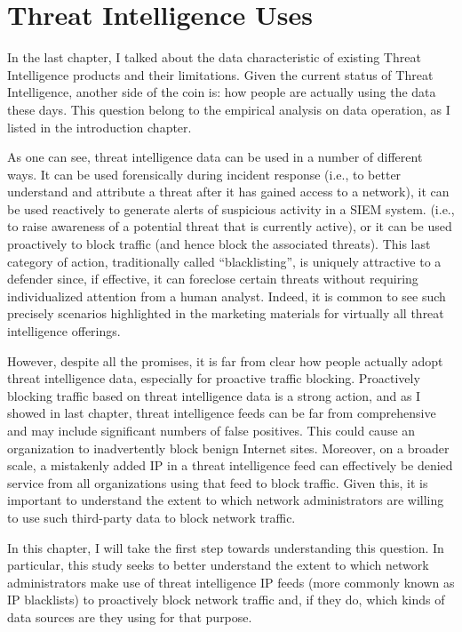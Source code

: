 \chapter{Threat Intelligence Uses}
\label{chapter:data_usage}

In the last chapter, I talked about the data characteristic of 
existing Threat Intelligence products and their limitations. Given
the current status of Threat Intelligence, another side of the coin is:
how people are actually using the data these days. This question belong 
to the empirical analysis on data operation, as I listed in the 
introduction chapter.

As one can see, threat intelligence data can be used in a number
of different ways. It can be used forensically during incident response
(i.e., to better understand and attribute a threat after it has gained
access to a network), it can be used reactively to generate alerts
of suspicious activity in a SIEM system. 
(i.e., to raise awareness of a potential threat
that is currently active), or it can be used proactively to block
traffic (and hence block the associated threats). This last category
of action, traditionally called ``blacklisting'', is uniquely
attractive to a defender since, if effective, it can foreclose certain
threats without requiring individualized attention from a human
analyst. Indeed, it is common to see such precisely scenarios
highlighted in the marketing materials for virtually all threat
intelligence offerings.

However, despite all the promises, it is far from clear how people 
actually adopt threat intelligence data, especially for proactive
traffic blocking. Proactively blocking traffic based on threat 
intelligence data is a strong action, and as I showed in last chapter,
threat intelligence feeds can be far from comprehensive and may include
significant numbers of false positives. This could cause an organization
to inadvertently block benign Internet sites. Moreover, on a broader 
scale, a mistakenly added IP in a threat intelligence feed can
effectively be denied service from all organizations using that feed
to block traffic. Given this, it is important to understand the extent
to which network administrators are willing to use such third-party data 
to block network traffic.

In this chapter, I will take the first step towards understanding this
question. In particular, this study seeks to better understand the extent 
to which network administrators make use of threat intelligence IP feeds
(more commonly known as IP blacklists) to proactively block network 
traffic and, if they do, which kinds of data sources are they using for 
that purpose.

